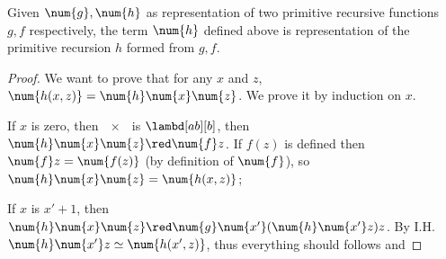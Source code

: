 \documentclass[../../../include/open-logic-section]{subfiles}
\begin{document}
\begin{lem}
  Given $\num{g},\num{h}$ as representation of two primitive recursive
  functions $g,f$ respectively, the
  term $\num{h}$ defined above is representation of the primitive
  recursion $h$ formed from $g,f$.
\end{lem}
\begin{proof}
  We want to prove that for any $x$ and $z$, $\num{h(x,z)} = \num{h}
  \num{x} \num{z}$. We prove it by induction on $x$.

  If $x$ is zero, then $\num{x}$ is $\lambd[ab][b]$, then $\num{h} \num{x}
  \num{z} \red \num{f} z$. If $f(z)$ is defined then $\num{f} z =
  \num{f(z)}$ (by definition of $\num{f}$), so $\num{h} \num{x} \num{z}
  = \num{h(x,z)}$;
  
  If $x$ is $x'+1$, then $\num{h} \num{x}
  \num{z} \red \num{g} \num{x'} (\num{h} \num{x'} z) z$. By I.H.
  $\num{h} \num{x'} z \simeq \num{h(x',z)}$, thus everything should
  follows and 
\end{proof}
\end{document}
